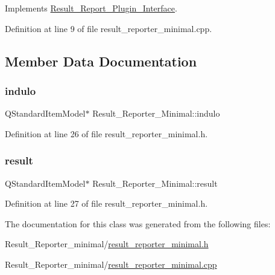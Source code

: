 Implements \hyperlink{classResult__Report__Plugin__Interface_a7dc45f2c25e0f4f4f99b2d7cd1799aa0}{Result\+\_\+\+Report\+\_\+\+Plugin\+\_\+\+Interface}.



Definition at line 9 of file result\+\_\+reporter\+\_\+minimal.\+cpp.



\subsection{Member Data Documentation}
\mbox{\label{classResult__Reporter__Minimal_a30391e0ed51c95c0904a4f11810d3a8b}} 
\subsubsection{\texorpdfstring{indulo}{indulo}}
{\footnotesize\ttfamily Q\+Standard\+Item\+Model$\ast$ Result\+\_\+\+Reporter\+\_\+\+Minimal\+::indulo\hspace{0.3cm}{\ttfamily [private]}}



Definition at line 26 of file result\+\_\+reporter\+\_\+minimal.\+h.

\mbox{\label{classResult__Reporter__Minimal_aed1a497f319d5bf551f37d576a197da7}} 
\subsubsection{\texorpdfstring{result}{result}}
{\footnotesize\ttfamily Q\+Standard\+Item\+Model$\ast$ Result\+\_\+\+Reporter\+\_\+\+Minimal\+::result\hspace{0.3cm}{\ttfamily [private]}}



Definition at line 27 of file result\+\_\+reporter\+\_\+minimal.\+h.



The documentation for this class was generated from the following files\+:\begin{DoxyCompactItemize}
\item 
Result\+\_\+\+Reporter\+\_\+minimal/\hyperlink{result__reporter__minimal_8h}{result\+\_\+reporter\+\_\+minimal.\+h}\item 
Result\+\_\+\+Reporter\+\_\+minimal/\hyperlink{result__reporter__minimal_8cpp}{result\+\_\+reporter\+\_\+minimal.\+cpp}\end{DoxyCompactItemize}

